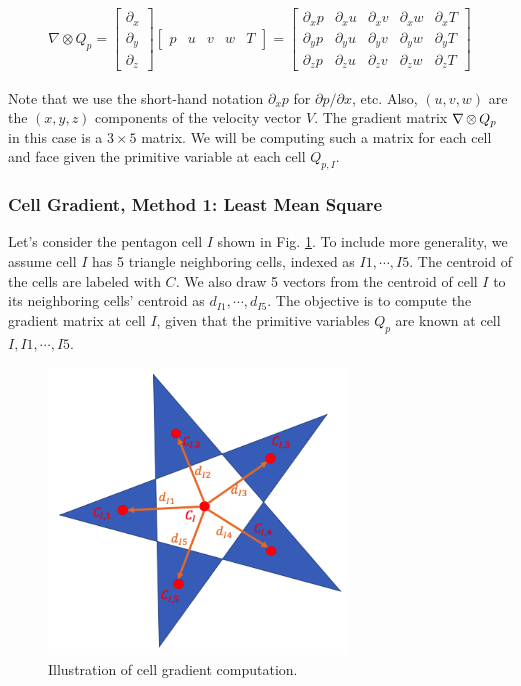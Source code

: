 \documentclass[12pt, letterpaper]{report}
\begin{document}
\begin{align*}
   \nabla \mathop{\otimes} Q_p = \begin{bmatrix} \partial_x \\ \partial_y \\ \partial_z \end{bmatrix}
   \begin{bmatrix}p & u & v & w & T\end{bmatrix} = 
   \begin{bmatrix}
      \partial_x p &\partial_x u &\partial_x v &\partial_x w &\partial_x T \\
      \partial_y p &\partial_y u &\partial_y v &\partial_y w &\partial_y T \\
      \partial_z p &\partial_z u &\partial_z v &\partial_z w &\partial_z T 
   \end{bmatrix}
\end{align*}

Note that we use the short-hand notation $\partial_x p$ for $\partial p/\partial x$, etc. Also, $(u,
v, w)$ are the $(x,y,z)$ components of the velocity vector $V$. The gradient matrix $\nabla \mathop{\otimes} Q_p$
in this case is a $3 \times 5$ matrix. We will be computing such a matrix for each cell and face
given the primitive variable at each cell $Q_{p,I}$.

\subsubsection{Cell Gradient, Method 1: Least Mean Square}

Let's consider the pentagon cell $I$ shown in Fig. \ref{figcellg}. To include more generality, we
assume cell $I$ has 5 triangle neighboring cells, indexed as $I1, \cdots, I5$. The centroid of
the cells are labeled with $C$. We also draw 5 vectors from the centroid of cell $I$ to its
neighboring cells' centroid as $d_{I1}, \cdots, d_{I5}$. The objective is to compute the gradient
matrix at cell $I$, given that the primitive variables $Q_p$ are known at cell $I, I1, \cdots,
I5$.

\begin{figure}[H]
   \centering
   \includegraphics[height=3in]{Algorithm1.png}
   \caption{Illustration of cell gradient computation.}
   \label{figcellg}
\end{figure}
\end{document}
